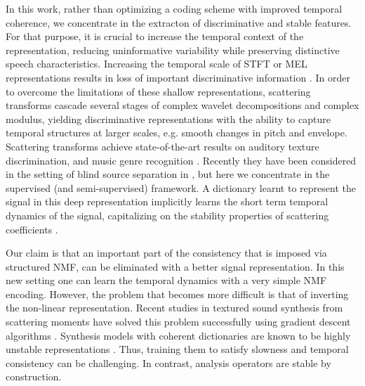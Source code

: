 In this work, rather than optimizing a coding scheme with improved temporal coherence, 
we concentrate in the extracton of discriminative and stable features. 
For that purpose, it is crucial to increase the temporal context of the representation, 
reducing uninformative variability while preserving distinctive speech characteristics.
Increasing the temporal scale of STFT or MEL representations results 
in loss of important discriminative information \cite{deepscatt}. 
In order to overcome the limitations of these shallow representations, 
scattering transforms \cite{deepscatt, pami} cascade several 
stages of complex wavelet decompositions and complex modulus, yielding 
discriminative representations with the ability to capture temporal structures at larger scales, 
e.g. smooth changes in pitch and envelope. 
Scattering transforms achieve state-of-the-art results on auditory texture discrimination, and music genre recognition \cite{deepscatt, phdjoan}.
Recently they have been considered in the setting of blind source separation in \cite{stephane_bss}, 
but here we concentrate in the supervised (and semi-supervised) framework.
A dictionary learnt to represent the signal in this deep representation implicitly learns the short term temporal dynamics of the signal,
capitalizing on the stability properties of scattering coefficients \cite{pami}.


Our claim is that an important part of the consistency that is imposed via structured NMF, can be eliminated with a better signal representation.
In this new setting one can learn the temporal dynamics with a very simple NMF encoding. 
However, the problem that becomes
more difficult is that of inverting the non-linear representation. 
Recent studies in textured sound synthesis from scattering
moments have solved this problem successfully using gradient descent algorithms \cite{bruna2013audio}.
Synthesis models with coherent dictionaries are known to be highly unstable representations \cite{jenatton2012local}. 
Thus, training them to satisfy slowness and temporal consistency can be challenging. 
In contrast, analysis operators are stable by construction.

